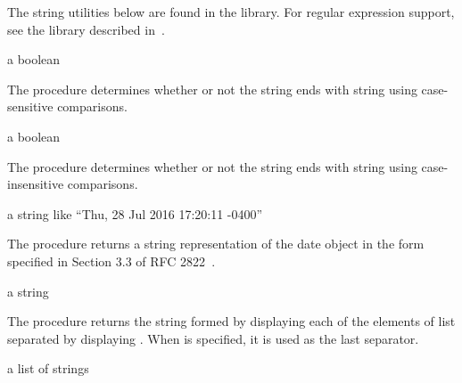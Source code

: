 The string utilities below are found in the  library. For regular expression support, see the
 library described in~\cite{pregexp}.

\begin{procedure}
\end{procedure}
\returns{} a boolean

The  procedure determines whether or not the string
 ends with string  using case-sensitive comparisons.

\begin{procedure}
\end{procedure}
\returns{} a boolean

The  procedure determines whether or not the
string  ends with string  using case-insensitive
comparisons.

\begin{procedure}
\end{procedure}
\returns{} a string like ``Thu, 28 Jul 2016 17:20:11 -0400''

The  procedure returns a string representation of
the date object  in the form specified in Section 3.3 of RFC
2822~\cite{RFC2822}.

\begin{procedure}
\end{procedure}
\returns{} a string

The  procedure returns the string formed by displaying each
of the elements of list  separated by displaying
. When  is specified, it is used as
the last separator.

\begin{procedure}
\end{procedure}
\returns{} a list of strings

